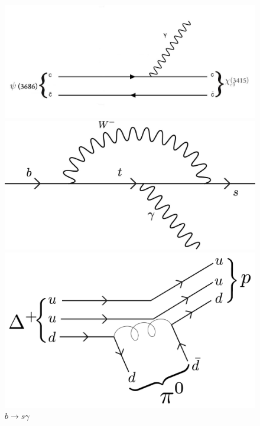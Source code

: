 \begin{figure}[hbtp]
    \centering
    \begin{minipage}{0.4\textwidth}
        \includegraphics[scale=0.2]{Feynman/feynm1.jpg}
        \caption{$\psi(3686) \to \chi_{0}(3145) + \gamma$}
    \end{minipage}
    \hspace{0.1\textwidth}
    \begin{minipage}{0.4\textwidth}
        \includegraphics[scale=0.25]{Feynman/eeqq-01.jpg}
        \caption{$b \to s \gamma$}
    \end{minipage}
    \vspace{30pt}
    \begin{minipage}{0.4\textwidth}
        \includegraphics[scale=0.045]{Feynman/Delta+-01.jpg}

\end{minipage}
\end{figure}

